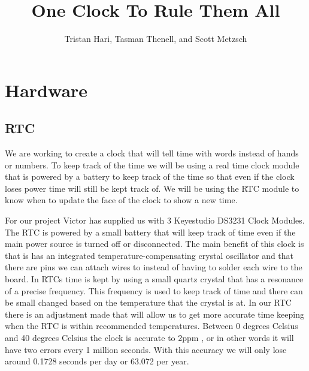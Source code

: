 \documentclass[10pt,draftclsnofoot,onecolumn]{IEEEtran}
\begin{document}
\title{One Clock To Rule Them All}
\author{Tristan Hari, Tasman Thenell, and Scott Metzsch}
\maketitle

\newpage
\section{Hardware}
\subsection{RTC}
We are working to create a clock that will tell time with words instead of hands or numbers. To keep track of the time we will be using a real time clock module that is powered by a battery to keep track of the time so that even if the clock loses power time will still be kept track of. We will be using the RTC module to know when to update the face of the clock to show a new time. 

For our project Victor has supplied us with 3 Keyestudio DS3231 Clock Modules. The RTC is powered by a small battery that will keep track of time even if the main power source is turned off or disconnected. The main benefit of this clock is that is has an integrated temperature-compensating crystal oscillator and that there are pins we can attach wires to instead of having to solder each wire to the board. In RTCs time is kept by using a small quartz crystal that has a resonance of a precise frequency. This frequency is used to keep track of time and there can be small changed based on the temperature that the crystal is at. In our RTC there is an adjustment made that will allow us to get more accurate time keeping when the RTC is within recommended temperatures. Between 0 degrees Celsius and 40 degrees Celsius the clock is accurate to 2ppm \cite{ksRTC}, or in other words it will have two errors every 1 million seconds. With this accuracy we will only lose around 0.1728 seconds per day or 63.072 per year. 
\end{document}
